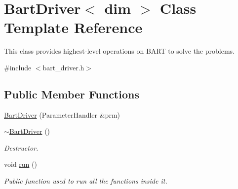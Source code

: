 \hypertarget{class_bart_driver}{}\section{Bart\+Driver$<$ dim $>$ Class Template Reference}
\label{class_bart_driver}


This class provides highest-\/level operations on B\+A\+RT to solve the problems.  




{\ttfamily \#include $<$bart\+\_\+driver.\+h$>$}

\subsection*{Public Member Functions}
\begin{DoxyCompactItemize}
\item 
\hyperlink{class_bart_driver_acad3b3200543d46ab9e4c78b860f822c}{Bart\+Driver} (Parameter\+Handler \&prm)
\item 
\hyperlink{class_bart_driver_aa89fe626d99cb4013b83d5e99698a9f3}{$\sim$\+Bart\+Driver} ()
\begin{DoxyCompactList}\small\item\em Destructor. \end{DoxyCompactList}\item 
void \hyperlink{class_bart_driver_a20c70ef3733fc4406353e6fdfee6c684}{run} ()
\begin{DoxyCompactList}\small\item\em Public function used to run all the functions inside it. \end{DoxyCompactList}\end{DoxyCompactItemize}

